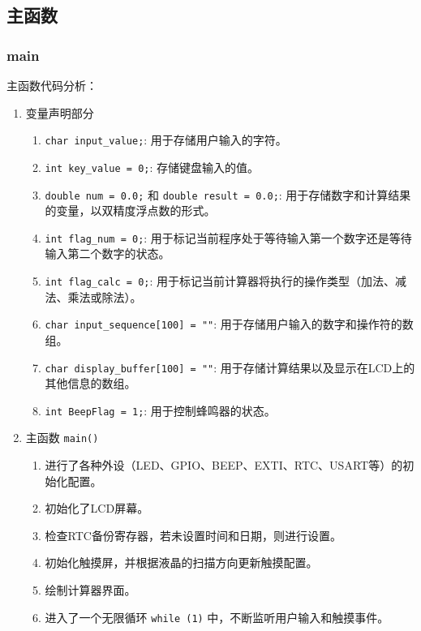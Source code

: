 \documentclass{theme-2639013-final}
\begin{document}
\subsection{主函数}

\subsubsection{main}

主函数代码分析：

\begin{enumerate}
  \item 变量声明部分
    \begin{enumerate}
      \item \texttt{char input\_value;}: 用于存储用户输入的字符。
      \item \texttt{int key\_value = 0;}: 存储键盘输入的值。
      \item \texttt{double num = 0.0;} 和 \texttt{double result = 0.0;}: 用于存储数字和计算结果的变量，以双精度浮点数的形式。
      \item \texttt{int flag\_num = 0;}: 用于标记当前程序处于等待输入第一个数字还是等待输入第二个数字的状态。
      \item \texttt{int flag\_calc = 0;}: 用于标记当前计算器将执行的操作类型（加法、减法、乘法或除法）。
      \item \texttt{char input\_sequence[100] = ""}: 用于存储用户输入的数字和操作符的数组。
      \item \texttt{char display\_buffer[100] = ""}: 用于存储计算结果以及显示在LCD上的其他信息的数组。
      \item \texttt{int BeepFlag = 1;}: 用于控制蜂鸣器的状态。
    \end{enumerate}

  \item 主函数 \texttt{main()}
    \begin{enumerate}
      \item 进行了各种外设（LED、GPIO、BEEP、EXTI、RTC、USART等）的初始化配置。
      \item 初始化了LCD屏幕。
      \item 检查RTC备份寄存器，若未设置时间和日期，则进行设置。
      \item 初始化触摸屏，并根据液晶的扫描方向更新触摸配置。
      \item 绘制计算器界面。
      \item 进入了一个无限循环 \texttt{while (1)} 中，不断监听用户输入和触摸事件。
    \end{enumerate}


\end{enumerate}
\end{document}

